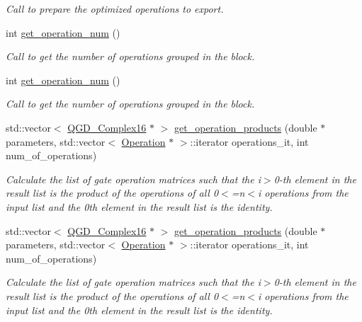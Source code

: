 \begin{DoxyCompactItemize}
\begin{DoxyCompactList}\small\item\em Call to prepare the optimized operations to export. \end{DoxyCompactList}\item 
int \hyperlink{class_operation__block_a27592a2d25c7e74416de2b9d7997efca}{get\+\_\+operation\+\_\+num} ()
\begin{DoxyCompactList}\small\item\em Call to get the number of operations grouped in the block. \end{DoxyCompactList}\item 
int \hyperlink{class_operation__block_a27592a2d25c7e74416de2b9d7997efca}{get\+\_\+operation\+\_\+num} ()
\begin{DoxyCompactList}\small\item\em Call to get the number of operations grouped in the block. \end{DoxyCompactList}\item 
std\+::vector$<$ \hyperlink{struct_q_g_d___complex16}{Q\+G\+D\+\_\+\+Complex16} $\ast$ $>$ \hyperlink{class_decomposition___base_a7e6efc3b157653de20275e234d4df3d9}{get\+\_\+operation\+\_\+products} (double $\ast$parameters, std\+::vector$<$ \hyperlink{class_operation}{Operation} $\ast$ $>$\+::iterator operations\+\_\+it, int num\+\_\+of\+\_\+operations)
\begin{DoxyCompactList}\small\item\em Calculate the list of gate operation matrices such that the i$>$0-\/th element in the result list is the product of the operations of all 0$<$=n$<$i operations from the input list and the 0th element in the result list is the identity. \end{DoxyCompactList}\item 
std\+::vector$<$ \hyperlink{struct_q_g_d___complex16}{Q\+G\+D\+\_\+\+Complex16} $\ast$ $>$ \hyperlink{class_decomposition___base_a7f3fd202c32e65cbc312ec61d426442a}{get\+\_\+operation\+\_\+products} (double $\ast$parameters, std\+::vector$<$ \hyperlink{class_operation}{Operation} $\ast$ $>$\+::iterator operations\+\_\+it, int num\+\_\+of\+\_\+operations)
\begin{DoxyCompactList}\small\item\em Calculate the list of gate operation matrices such that the i$>$0-\/th element in the result list is the product of the operations of all 0$<$=n$<$i operations from the input list and the 0th element in the result list is the identity. \end{DoxyCompactList}\item 

\end{DoxyCompactItemize}
